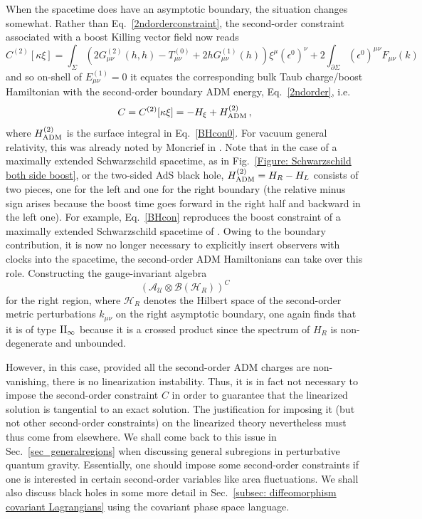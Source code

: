 \documentclass[]{jkpaper}
\theoremstyle{plain}
\theoremstyle{definition}
\begin{document}
When the spacetime does have an asymptotic boundary, the situation changes somewhat. Rather than Eq.~\eqref{2ndorderconstraint}, the second-order constraint associated with a boost Killing vector field now reads
\begin{equation}\label{BHcon0}
    C^{(2)}[\kappa\xi]=\int_\Sigma\left(2G^{(2)}_{\mu \nu}(h,h)-T_{\mu \nu}^{(0)}+2hG^{(1)}_{\mu \nu}(h)\right)\xi^\mu(\epsilon^0)^\nu+2\int_{\partial\Sigma}(\epsilon^0)^{\mu \nu}F_{\mu \nu}(k)\,
\end{equation}
and so on-shell of $E^{(1)}_{\mu \nu}=0$ it equates the corresponding bulk Taub charge/boost Hamiltonian with the second-order boundary ADM energy, Eq.~\eqref{2ndorder}, i.e.
\begin{equation}\label{BHcon}
    C=C^{(2)}[\kappa\xi]=-H_\xi+H^{(2)}_{\rm ADM}\,,
\end{equation}
where $H_{\rm ADM}^{(2)}$ is the surface integral in Eq.~\eqref{BHcon0}. For vacuum general relativity, this was already noted by Moncrief in \cite[Sec.~6]{Moncrief:1976un}. Note that in the case of a maximally extended Schwarzschild spacetime, as in Fig.~\ref{Figure: Schwarzschild both side boost}, or the two-sided AdS black hole, $H_{\rm ADM}^{(2)}=H_R-H_L$ consists of two pieces, one for the left and one for the right boundary (the relative minus sign arises because the boost time goes forward in the right half and backward in the left one). For example, Eq.~\eqref{BHcon} reproduces the boost constraint of a maximally extended Schwarzschild spacetime of \cite{Chandrasekaran:2022cip}. Owing to the boundary contribution, it is now no longer necessary to explicitly insert observers with clocks into the spacetime, the second-order ADM Hamiltonians can take over this role. Constructing the gauge-invariant algebra
\begin{equation}
    \left(\mathcal{A}_\mathcal{U}\otimes\mathcal{B}(\mathcal{H}_R)\right)^C
\end{equation}
for the right region, where $\mathcal{H}_R$ denotes the Hilbert space of the second-order metric perturbations $k_{\mu \nu}$ on the right asymptotic boundary, one again finds that it is of type $\rm{II}_\infty$ because it is a crossed product since the spectrum of $H_R$ is non-degenerate and unbounded. 

However, in this case, provided all the second-order ADM charges are non-vanishing, there is no linearization instability. Thus, it is in fact not necessary to impose the second-order constraint $C$ in order to guarantee that the linearized solution is tangential to an exact solution. The justification for imposing it (but not other second-order constraints) on the linearized theory nevertheless must thus come from elsewhere. We shall come back to this issue in Sec.~\ref{sec_generalregions} when discussing general subregions in perturbative quantum gravity. Essentially, one should impose some second-order constraints if one is interested in certain second-order variables like area fluctuations. We shall also discuss black holes in some more detail in Sec.~\ref{subsec: diffeomorphism covariant Lagrangians} using the covariant phase space language. 
\end{document}
